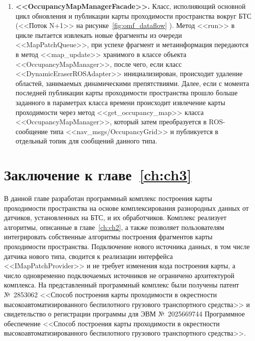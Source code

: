 \begin{enumerate}
	\item \textbf{<<OccupancyMapManagerFacade>>.} Класс, исполняющий основной цикл обновления и публикации карты проходимости пространства вокруг БТС (<<Поток N+1>> на рисунке~\cref{fig:omf_dataflow} ). Метод <<run>> в цикле пытается извлекать новые фрагменты из очереди <<MapPatchQueue>>, при успехе фрагмент и метаинформация передаются в метод <<map\_update>> хранимого в классе объекта <<OccupancyMapManager>>, после чего, если класс <<DynamicEraserROSAdapter>> инициализирован, происходит удаление областей, занимаемых динамическими препятствиями. Далее, если с момента последней публикации карты проходимости пространства прошло больше заданного в параметрах класса времени происходит извлечение карты проходимости через метод <<get\_occupancy\_map>> класса <<OccupancyMapManager>>, который затем преобразуется в ROS-сообщение типа <<nav\_msgs/OccupancyGrid>> и публикуется в отдельный топик для сообщений данного типа. 

\end{enumerate}


\section{Заключение к главе~\ref{ch:ch3}}

В данной главе разработан программный комплекс построения карты проходимости пространства на основе комплексирования разнородных данных от датчиков, установленных на БТС, и их обработчиков. Комплекс реализует алгоритмы, описанные в главе~\cref{ch:ch2}, а также позволяет пользователям интегрировать собственные алгоритмы построения фрагментов карты проходимости пространства. Подключение нового источника данных, в том числе датчика нового типа, сводится к реализации интерфейса <<IMapPatchProvider>> и не требует изменения кода построения карты, а число одновременно подключаемых источников не ограничено архитектурой комплекса. На представленный программный комплекс были получены патент №~2853062 <<Способ построения карты проходимости в окрестности высокоавтоматизированного беспилотного грузового транспортного средства>> и свидетельство о регистрации программы для ЭВМ №~2025669744 Программное обеспечение <<Способ построения карты проходимости в окрестности высокоавтоматизированного беспилотного грузового транспортного средства>>. 

